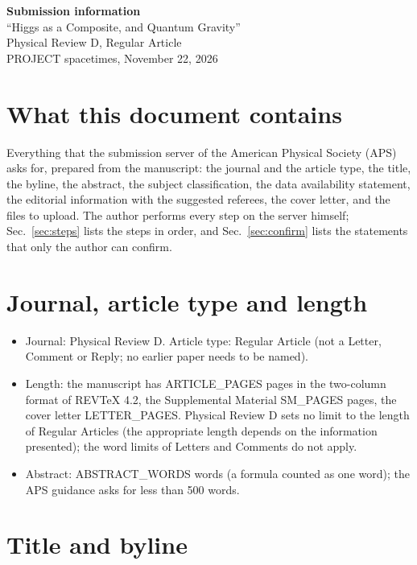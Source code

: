 \documentclass[11pt]{article}
\begin{document}
\begin{center}
{\Large\bf Submission information}\\[4pt]
{\large ``Higgs as a Composite, and Quantum Gravity''}\\[2pt]
Physical Review D, Regular Article\\[2pt]
PROJECT spacetimes, November 22, 2026
\end{center}

\section{What this document contains}

Everything that the submission server of the American Physical Society (APS) asks for, prepared from the manuscript: the
journal and the article type, the title, the byline, the abstract, the subject classification, the data availability
statement, the editorial information with the suggested referees, the cover letter, and the files to upload. The author
performs every step on the server himself; Sec.~\ref{sec:steps} lists the steps in order, and Sec.~\ref{sec:confirm} lists
the statements that only the author can confirm.

\section{Journal, article type and length}

\begin{itemize}
\item Journal: Physical Review D. Article type: Regular Article (not a Letter, Comment or Reply; no earlier paper needs to be
named).
\item Length: the manuscript has {{ARTICLE_PAGES}} pages in the two-column format of REVTeX 4.2, the Supplemental Material
{{SM_PAGES}} pages, the cover letter {{LETTER_PAGES}}. Physical Review D sets no limit to the length of Regular Articles
(the appropriate length depends on the information presented); the word limits of Letters and Comments do not apply.
\item Abstract: {{ABSTRACT_WORDS}} words (a formula counted as one word); the APS guidance asks for less than 500 words.
\end{itemize}

\section{Title and byline}
\label{sec:title}
\end{document}
